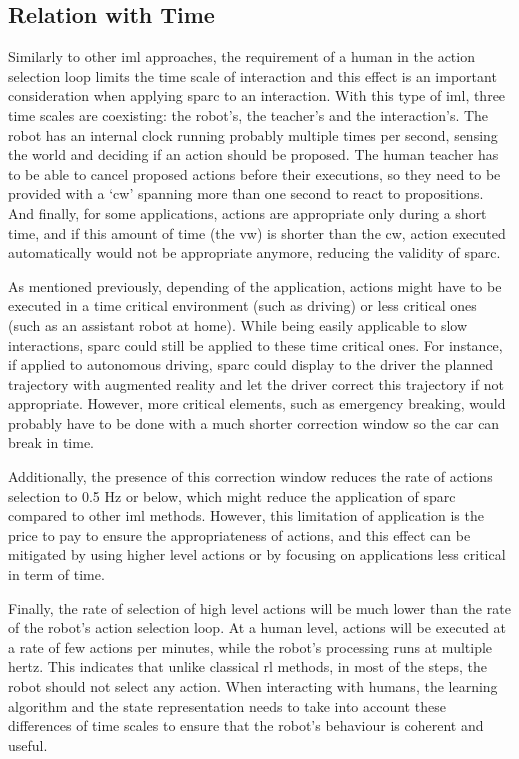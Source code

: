 \subsection{Relation with Time} \label{ssec:sparc_time}
Similarly to other \gls{iml} approaches, the requirement of a human in the action selection loop limits the time scale of interaction and this effect is an important consideration when applying \gls{sparc} to an interaction. With this type of \gls{iml}, three time scales are coexisting: the robot's, the teacher's and the interaction's. The robot has an internal clock running probably multiple times per second, sensing the world and deciding if an action should be proposed. The human teacher has to be able to cancel proposed actions before their executions, so they need to be provided with a `\gls{cw}' spanning more than one second to react to propositions. And finally, for some applications, actions are appropriate only during a short time, and if this amount of time (the \gls{vw}) is shorter than the \gls{cw}, action executed automatically would not be appropriate anymore, reducing the validity of \gls{sparc}.

As mentioned previously, depending of the application, actions might have to be executed in a time critical environment (such as driving) or less critical ones (such as an assistant robot at home). While being easily applicable to slow interactions, \gls{sparc} could still be applied to these time critical ones. For instance, if applied to autonomous driving, \gls{sparc} could display to the driver the planned trajectory with augmented reality and let the driver correct this trajectory if not appropriate. However, more critical elements, such as emergency breaking, would probably have to be done with a much shorter correction window so the car can break in time. 

Additionally, the presence of this correction window reduces the rate of actions selection to 0.5 Hz or below, which might reduce the application of \gls{sparc} compared to other \gls{iml} methods. However, this limitation of application is the price to pay to ensure the appropriateness of actions, and this effect can be mitigated by using higher level actions or by focusing on applications less critical in term of time. 

Finally, the rate of selection of high level actions will be much lower than the rate of the robot's action selection loop. At a human level, actions will be executed at a rate of few actions per minutes, while the robot's processing runs at multiple hertz. This indicates that unlike classical \gls{rl} methods, in most of the steps, the robot should not select any action. When interacting with humans, the learning algorithm and the state representation needs to take into account these differences of time scales to ensure that the robot's behaviour is coherent and useful.

